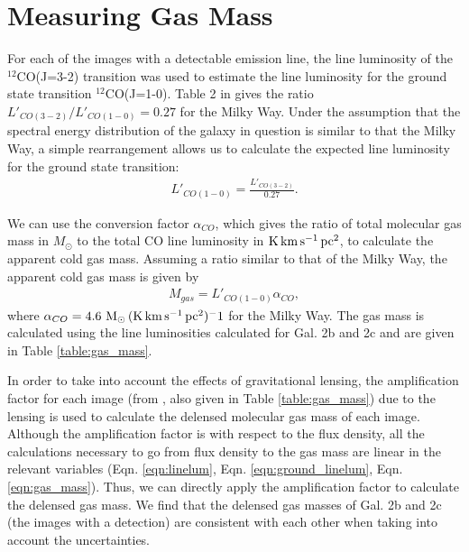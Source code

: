 \documentclass[11pt]{article}
\begin{document}
\section*{Measuring Gas Mass}

For each of the images with a detectable emission line, the line luminosity of the $^{12}$CO(J=3-2) transition was used to estimate the line luminosity for the ground state transition $^{12}$CO(J=1-0). Table 2 in \cite{Carilli2013} gives the ratio $L'_{CO(3-2)} / L'_{CO(1-0)} = 0.27$ for the Milky Way. Under the assumption that the spectral energy distribution of the galaxy in question is similar to that the Milky Way, a simple rearrangement allows us to calculate the expected line luminosity for the ground state transition:
\begin{align}\label{eqn:ground_linelum}
	L'_{CO(1-0)} = \frac{L'_{CO(3-2)}}{0.27}.
\end{align}

We can use the conversion factor $\alpha_{CO}$, which gives the ratio of total molecular gas mass in $M_\odot$ to the total CO line luminosity in ${\rm K\,km\,s^{-1}\,pc^2}$, to calculate the apparent cold gas mass. Assuming a ratio similar to that of the Milky Way, the apparent cold gas mass is given by 
\begin{align}\label{eqn:gas_mass}
	M_{gas} = L'_{CO(1-0)} \alpha_{CO},
\end{align}
where $\alpha_{CO} = 4.6~{\rm M_\odot\,(K\,km\,s^{-1}\,pc^2)^-1}$ for the Milky Way. The gas mass is calculated using the line luminosities calculated for Gal. 2b and 2c and are given in Table \ref{table:gas_mass}.

In order to take into account the effects of gravitational lensing, the amplification factor for each image (from \cite{MacKenzie2014}, also given in Table \ref{table:gas_mass}) due to the lensing is used to calculate the delensed molecular gas mass of each image. Although the amplification factor is with respect to the flux density, all the calculations necessary to go from flux density to the gas mass are linear in the relevant variables (Eqn. \ref{eqn:linelum}, Eqn. \ref{eqn:ground_linelum}, Eqn. \ref{eqn:gas_mass}). Thus, we can directly apply the amplification factor to calculate the delensed gas mass. We find that the delensed gas masses of Gal. 2b and 2c (the images with a detection) are consistent with each other when taking into account the uncertainties. 
\end{document}

